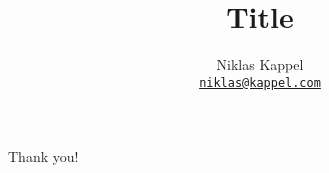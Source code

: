 \documentclass[english]{mytalk}
\title{Title}
\author{Niklas Kappel \\ \href{mailto:niklas@kappel.com}{\texttt{niklas@kappel.com}}}
\date{}
\begin{document}
  \begin{frame}[plain]
    \maketitle
  \end{frame}
  \addtocounter{framenumber}{-1}

  

  \begin{frame}[plain]
    \centering \Huge Thank you!
  \end{frame}
  \addtocounter{framenumber}{-1}

  \appendix


\end{document}
